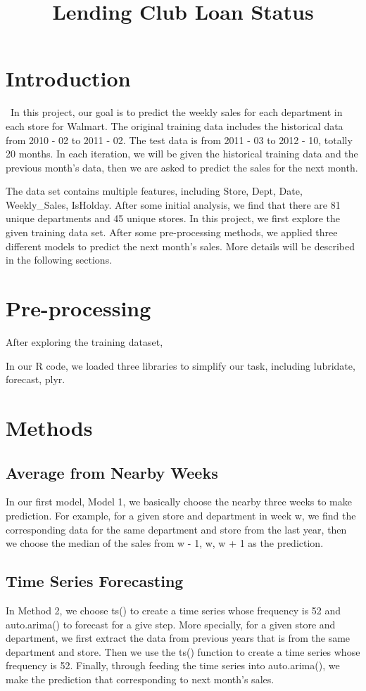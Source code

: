 \documentclass[12pt]{article}
\title{Lending Club Loan Status}
\begin{document}
%
\maketitle

\section{Introduction}
\quad\ In this project, our goal is to predict the weekly sales for each department in each store for Walmart. The original training data includes the historical data from 2010 - 02 to 2011 - 02.  The test data is from 2011 - 03 to 2012 - 10, totally 20 months. In each iteration, we will be given the historical training data and the previous month's data, then we are asked to predict the sales for the next month.

The data set contains multiple features, including Store, Dept, Date, Weekly\_Sales, IsHolday. After some initial analysis, we find that there are 81 unique departments and 45 unique stores. In this project, we first explore the given training data set. After some pre-processing methods, we applied three different models to predict the next month's sales. More details will be described in the following sections.

\section{Pre-processing}
After exploring the training dataset, 

In our R code, we loaded three libraries to simplify our task, including lubridate, forecast, plyr.


\section{Methods}

\subsection{Average from Nearby Weeks}
In our first model, Model 1, we basically choose the nearby three weeks to make prediction. For example, for a given store and department in week w, we find the corresponding data for the same department and store from the last year, then we choose the median of the sales from w - 1, w, w + 1 as the prediction.

\subsection{Time Series Forecasting}
In Method 2, we choose ts() to create a time series whose frequency is 52 and auto.arima() to forecast for a give step. More specially, for a given store and department, we first extract the data from previous years that is from the same department and store. Then we use the ts() function to create a time series whose frequency is 52. Finally, through feeding the time series into auto.arima(), we make the prediction that corresponding to next month's sales.
\end{document}
